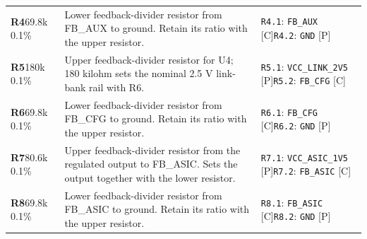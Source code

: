 \documentclass[11pt,a4paper]{article}
\begin{document}
\begin{longtable}{@{}P{27mm}P{83mm}P{58mm}@{}}
\textbf{R4}\newline 69.8k 0.1\% & Lower feedback-divider resistor from FB\_AUX to ground. Retain its ratio with the upper resistor. & \nolinkurl{R4.1}: \nolinkurl{FB_AUX} [C]\newline \nolinkurl{R4.2}: \nolinkurl{GND} [P] \\
\textbf{R5}\newline 180k 0.1\% & Upper feedback-divider resistor for U4; 180 kilohm sets the nominal 2.5 V link-bank rail with R6. & \nolinkurl{R5.1}: \nolinkurl{VCC_LINK_2V5} [P]\newline \nolinkurl{R5.2}: \nolinkurl{FB_CFG} [C] \\
\textbf{R6}\newline 69.8k 0.1\% & Lower feedback-divider resistor from FB\_CFG to ground. Retain its ratio with the upper resistor. & \nolinkurl{R6.1}: \nolinkurl{FB_CFG} [C]\newline \nolinkurl{R6.2}: \nolinkurl{GND} [P] \\
\textbf{R7}\newline 80.6k 0.1\% & Upper feedback-divider resistor from the regulated output to FB\_ASIC. Sets the output together with the lower resistor. & \nolinkurl{R7.1}: \nolinkurl{VCC_ASIC_1V5} [P]\newline \nolinkurl{R7.2}: \nolinkurl{FB_ASIC} [C] \\
\textbf{R8}\newline 69.8k 0.1\% & Lower feedback-divider resistor from FB\_ASIC to ground. Retain its ratio with the upper resistor. & \nolinkurl{R8.1}: \nolinkurl{FB_ASIC} [C]\newline \nolinkurl{R8.2}: \nolinkurl{GND} [P] \\

\end{longtable}
\end{document}
